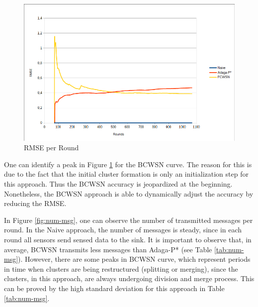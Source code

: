 \documentclass{acm_proc_article-sp}
\begin{document}
\begin{figure}[!htb]
\centering
	\includegraphics[scale=0.33]{FCWSN-RMSExRound02-SD1.png}
    \caption{RMSE per Round}
    \label{fig:rmse}
\end{figure}

One can identify a peak in Figure \ref{fig:rmse} for the BCWSN curve. The reason
for this is due to the fact that the initial cluster formation is only an
initialization step for this approach.
Thus the BCWSN accuracy is jeopardized at the beginning. Nonetheless, the
BCWSN approach is able to dynamically adjust the accuracy by reducing the RMSE.

In Figure \ref{fig:num-msg}, one can observe the number of transmitted messages
per round. In the Naive approach, the number of messages is steady, since in
each round all sensors send sensed data to the sink. It is important to observe
that, in average, BCWSN transmits less messages than Adaga-P* (see Table
\ref{tab:num-msg}). However, there are some peaks in BCWSN curve, which
represent periods in time when clusters are being restructured (splitting or
merging), since the clusters, in this approach, are always undergoing division
and merge process. This can be proved by the high standard deviation for this
approach in Table \ref{tab:num-msg}.
\end{document}
